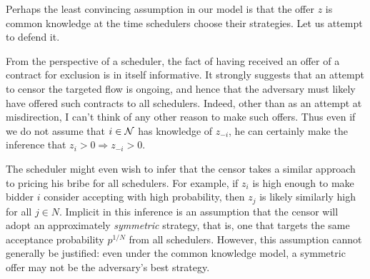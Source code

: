 Perhaps the least convincing assumption in our model is that the offer $z$ is common knowledge at the time schedulers choose their strategies.
%
Let us attempt to defend it.

From the perspective of a scheduler, the fact of having received an offer of a contract for exclusion is in itself informative.
%
It strongly suggests that an attempt to censor the targeted flow is ongoing, and hence that the adversary must likely have offered such contracts to all schedulers.
%
Indeed, other than as an attempt at misdirection, I can't think of any other reason to make such offers.
%
Thus even if we do not assume that $i\in\mathcal{N}$ has knowledge of $z_{-i}$, he can certainly make the inference that $z_i>0 \Rightarrow z_{-i}>0$.

The scheduler might even wish to infer that the censor takes a similar approach to pricing his bribe for all schedulers.
%
For example, if $z_i$ is high enough to make bidder $i$ consider accepting with high probability, then $z_j$ is likely similarly high for all $j\in N$.
%
Implicit in this inference is an assumption that the censor will adopt an approximately \emph{symmetric} strategy, that is, one that targets the same acceptance probability $p^{1/N}$ from all schedulers.
%
However, this assumption cannot generally be justified: even under the common knowledge model, a symmetric offer may not be the adversary's best strategy.

